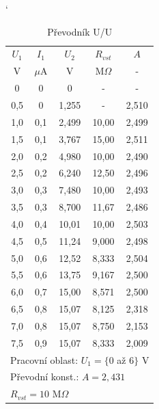 \documentclass[a4paper, czech]{article}
\begin{document}
\begin{minipage}{0.48\textwidth}
    \begin{table}[H]
        \catcode`
        \centering
        \caption{Převodník U/U}
        \begin{tabular}{ccccc}
            \toprule
            $U_1$  & $I_1$  & $U_2$    & $R_{vst}$  & $A$     \\
            \cmidrule(rl){1-1}
            \cmidrule(rl){2-2}
            \cmidrule(rl){3-3}
            \cmidrule(rl){4-4}
            \cmidrule(rl){5-5}
            V   & $\mu$A  & V     & M$\Omega$    & -     \\
            \midrule
            0   & 0   & 0     & -     & -     \\
            0,5 & 0   & 1,255 & -     & 2,510 \\
            1,0 & 0,1 & 2,499 & 10,00 & 2,499 \\
            1,5 & 0,1 & 3,767 & 15,00 & 2,511 \\
            2,0 & 0,2 & 4,980 & 10,00 & 2,490 \\
            2,5 & 0,2 & 6,240 & 12,50 & 2,496 \\
            3,0 & 0,3 & 7,480 & 10,00 & 2,493 \\
            3,5 & 0,3 & 8,700 & 11,67 & 2,486 \\
            4,0 & 0,4 & 10,01 & 10,00 & 2,503 \\
            4,5 & 0,5 & 11,24 & 9,000 & 2,498 \\
            5,0 & 0,6 & 12,52 & 8,333 & 2,504 \\
            5,5 & 0,6 & 13,75 & 9,167 & 2,500 \\
            6,0 & 0,7 & 15,00 & 8,571 & 2,500 \\
            6,5 & 0,8 & 15,07 & 8,125 & 2,318 \\
            7,0 & 0,8 & 15,07 & 8,750 & 2,153 \\
            7,5 & 0,9 & 15,07 & 8,333 & 2,009 \\
            \bottomrule
            \multicolumn{5}{l}{Pracovní oblast: $U_1 = \{0$ až $6\}$ V} \\
            \multicolumn{5}{l}{Převodní konst.: $A = 2,431$} \\
            \multicolumn{5}{l}{$R_{vst} = 10$ M$\Omega$} \\
        \end{tabular}
    \end{table}
\end{minipage}
\end{document}
